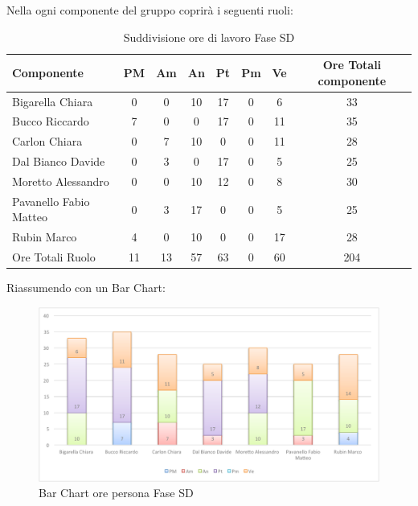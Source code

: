 				Nella  ogni componente del gruppo \groupname{} coprirà i seguenti ruoli:
				\begin{table}[H]
					\begin{center}
						\begin{tabular}{| l | c | c | c | c | c | c | c |}
							\hline
							Componente 					& PM	& Am	 & An 		& Pt 		& Pm 	& Ve 	& Ore Totali componente \\ \hline
							
							Bigarella Chiara 			& 0		& 0		& 10 		& 17 		& 0		& 6 		& 33 \\
							Bucco Riccardo 				& 7 	& 0		& 0			& 17 		& 0		& 11 		& 35 \\
							Carlon Chiara	 			& 0		& 7 	& 10 		& 0			& 0		& 11 		& 28 \\
							Dal Bianco Davide 			& 0		& 3		& 0			& 17 		& 0		& 5			& 25 \\
							Moretto Alessandro 			& 0		& 0 	& 10 		& 12 		& 0		& 8 		& 30 \\
							Pavanello Fabio Matteo	 	& 0		& 3		& 17 		& 0			& 0		& 5			& 25 \\
							Rubin Marco					& 4 	& 0		& 10 		& 0			& 0		& 17 		& 28 \\ \hline \hline
							
							Ore Totali Ruolo 			& 11 	& 13 	& 57 		& 63 		& 0		& 60		& 204\\ \hline
						\end{tabular}
					\end{center}
					\caption{Suddivisione ore di lavoro Fase SD}
				\end{table}
				Riassumendo con un Bar Chart:
				\begin{figure}[H]\centering
					\includegraphics[width=\textwidth]{PianoDiProgetto/Pics/ChartOreFaseSD.pdf}
					\caption{Bar Chart ore persona Fase SD}
				\end{figure}

